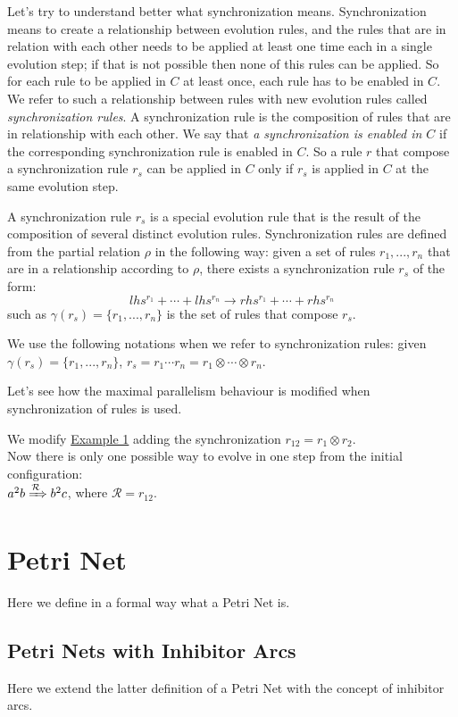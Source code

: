 Let's try to understand better what synchronization means.
Synchronization means to create a relationship between evolution rules, and the rules that are in relation with each other needs to be applied at least one time each in a single evolution step;
if that is not possible then none of this rules can be applied.
So for each rule to be applied in $C$ at least once, each rule has to be enabled in $C$.
We refer to such a relationship between rules with new evolution rules called \textit{synchronization rules}.
A synchronization rule is the composition of rules that are in relationship with each other.
We say that \textit{a synchronization is enabled in $C$} if the corresponding synchronization rule is enabled in $C$. 
So a rule $r$ that compose a synchronization rule $r_s$ can be applied in $C$ only if $r_s$ is applied in $C$ at the same evolution step. 

\begin{definition}
\label{def:sync_rule}
A synchronization rule $r_s$ is a special evolution rule that is the result of the composition of several distinct evolution rules.
Synchronization rules are defined from the partial relation $\rho$ in the following way:\newline
given a set of rules $r_1,...,r_n$ that are in a relationship according to $\rho$, there exists
a synchronization rule $r_s$ of the form:
\[ lhs^{r_1} + \cdots + lhs^{r_n} \rightarrow rhs^{r_1} + \cdots + rhs^{r_n} \] 
such as $\gamma(r_s)=\{r_1,...,r_n\}$ is the set of rules that compose $r_s$.

We use the following notations when we refer to synchronization rules: \newline
given $\gamma(r_s)=\{r_1,...,r_n\}$, $r_s=r_1 \cdots r_n = r_1 \otimes \cdots \otimes r_n$.
\end{definition}

Let's see how the maximal parallelism behaviour is modified when synchronization of rules is used.
\begin{example}
    We modify \hyperref[ex:flat_membrane]{Example 1} adding the synchronization 
    $r_{12} = r_1 \otimes r_2$.\\
    Now there is only one possible way to evolve in one step from the initial configuration:\\
    $a^2b \xRightarrow{\mathcal{R}} b^2c$, where $\mathcal{R}=r_{12}$.
\end{example}

\section{Petri Net}

Here we define in a formal way what a Petri Net is.

\subsection{Petri Nets with Inhibitor Arcs}

Here we extend the latter definition of a Petri Net with the concept of inhibitor arcs.
